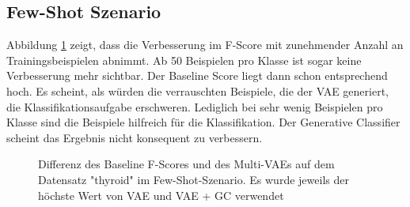 \subsection{Few-Shot Szenario}
Abbildung \ref{plt:thyroid-few-shot} zeigt, dass die Verbesserung im F-Score mit zunehmender Anzahl an Trainingsbeispielen abnimmt. Ab 50 Beispielen pro Klasse ist sogar keine Verbesserung mehr sichtbar. Der Baseline Score liegt dann schon entsprechend hoch. Es scheint, als würden die verrauschten Beispiele, die der VAE generiert, die Klassifikationsaufgabe erschweren. Lediglich bei sehr wenig Beispielen pro Klasse sind die Beispiele hilfreich für die Klassifikation. Der Generative Classifier scheint das Ergebnis nicht konsequent zu verbessern.

\begin{table}[H]
\centering
{}
\caption{Der F-Score auf dem Datensatz "thyroid" im Few-Shot Szenario. Für kleine Trainingsgrößen ergibt sich ein verbesserte Wert von bis zu $0.074$. Die Verbesserung nimmt mit der Anzahl originaler Trainingsbeispiele ab.}
\label{tab:eval_thyroid_few_shot}
\end{table}

\begin{figure}[H]
\centering
{}
\caption{Differenz des Baseline F-Scores und des Multi-VAEs auf dem Datensatz "thyroid" im Few-Shot-Szenario. Es wurde jeweils der höchste Wert von VAE und VAE + GC verwendet}
\label{plt:thyroid-few-shot}
\end{figure}

